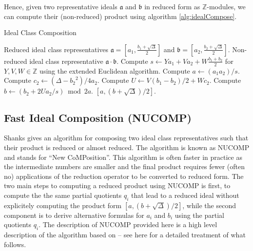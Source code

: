 \documentclass{ucalgthes1}
\theoremstyle{plain}
\theoremstyle{definition}
\newcommand{\ZZ}{\mathbb{Z}}
\begin{document}
\noindent
Hence, given two representative ideals $\mathfrak a$ and $\mathfrak b$ in reduced form as $\ZZ$-modules, we can compute their (non-reduced) product using algorithm \ref{alg:idealCompose}.

\begin{algorithm}[h!]
\caption{Ideal Class Composition}
\label{alg:idealCompose}
\begin{algorithmic}[1]
\REQUIRE Reduced ideal class representatives $\mathfrak a = \left[a_1, \frac{b_1 + \sqrt\Delta}{2}\right]$ and $\mathfrak b = \left[a_2, \frac{b_2 + \sqrt\Delta}{2}\right]$.
\ENSURE Non-reduced ideal class representative $\mathfrak a \cdot \mathfrak b$.
\STATE Compute $s \leftarrow Ya_1 + Va_2 + W\frac{b_1+b_2}{2}$ for $Y, V, W \in \ZZ$ using the extended Euclidean algorithm.
\STATE Compute $a \leftarrow (a_1a_2)/s$.
\STATE Compute $c_2 \leftarrow (\Delta-{b_2}^2)/4a_2$.
\STATE Compute $U \leftarrow V(b_1-b_2)/2 + Wc_2$.
\STATE Compute $b \leftarrow (b_2 + 2Ua_2/s) \bmod{2a}$.
\RETURN $[a, (b + \sqrt\Delta)/2]$.
\end{algorithmic}
\end{algorithm}


\subsection{Fast Ideal Composition (NUCOMP)}
\label{subsec:nucomp}
Shanks gives an algorithm for composing two ideal class representatives such that their product is reduced or almost reduced.  The algorithm is known as NUCOMP and stands for ``New CoMPosition''.  This algorithm is often faster in practice as the intermediate numbers are smaller and the final product requires fewer (often no) applications of the reduction operator to be converted to reduced form.  The two main steps to computing a reduced product using NUCOMP is first, to compute the the same partial quotients $q_i$ that lead to a reduced ideal without explicitely computing the product form $[a,(b+\sqrt\Delta)/2]$, while the second component is to derive alternative formulas for $a_i$ and $b_i$ using the partial quotients $q_i$.  The description of NUCOMP provided here is a high level description of the algorithm based on \cite[pp.119-123]{Jac09} -- see here for a detailed treatment of what follows.
\end{document}
